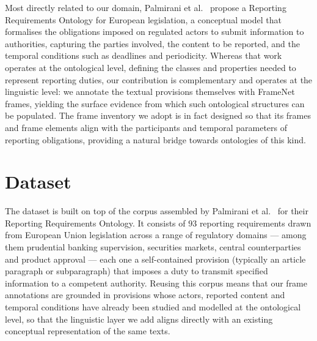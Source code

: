 \documentclass[10pt, a4paper, twocolumn]{article}
\begin{document}
Most directly related to our domain, Palmirani et
al.~\cite{palmirani-2025-reporting} propose a Reporting Requirements Ontology
for European legislation, a conceptual model that formalises the obligations
imposed on regulated actors to submit information to authorities, capturing the
parties involved, the content to be reported, and the temporal conditions such
as deadlines and periodicity. Whereas that work operates at the ontological
level, defining the classes and properties needed to represent reporting
duties, our contribution is complementary and operates at the linguistic level:
we annotate the textual provisions themselves with FrameNet frames, yielding
the surface evidence from which such ontological structures can be populated.
The frame inventory we adopt is in fact designed so that its frames and frame
elements align with the participants and temporal parameters of reporting
obligations, providing a natural bridge towards ontologies of this kind.

\section{Dataset}
\label{sec:dataset}

The dataset is built on top of the corpus assembled by Palmirani et
al.~\cite{palmirani-2025-reporting} for their Reporting Requirements Ontology.
It consists of $93$ reporting requirements drawn from European Union legislation
across a range of regulatory domains --- among them prudential banking
supervision, securities markets, central counterparties and product approval ---
each one a self-contained provision (typically an article paragraph or
subparagraph) that imposes a duty to transmit specified information to a
competent authority. Reusing this corpus means that our frame annotations are
grounded in provisions whose actors, reported content and temporal conditions
have already been studied and modelled at the ontological level, so that the
linguistic layer we add aligns directly with an existing conceptual
representation of the same texts.
\end{document}

